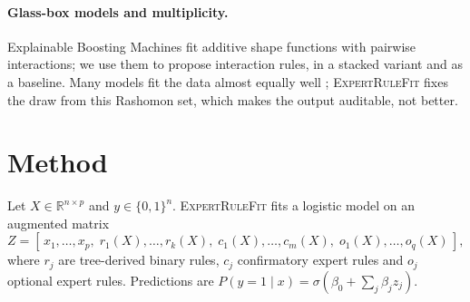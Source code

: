 \documentclass[11pt,a4paper]{article}
\theoremstyle{definition}\newtheorem{definition}{Definition}
\begin{document}
\paragraph{Glass-box models and multiplicity.} Explainable Boosting Machines \citep{lou2013,nori2019} fit additive shape functions with pairwise interactions; we use them to propose interaction rules, in a stacked variant and as a baseline. Many models fit the data almost equally well \citep{rudin2024}; \textsc{ExpertRuleFit} fixes the draw from this Rashomon set, which makes the output auditable, not better.

\begin{table}[h]
\centering\small
\caption{Positioning (summary of the cited works).}
\label{tab:position}
\end{table}

\section{Method}\label{sec:method}

Let $X\in\mathbb{R}^{n\times p}$ and $y\in\{0,1\}^n$. \textsc{ExpertRuleFit} fits a logistic model on an augmented matrix
\[
Z = [\,x_1,\dots,x_p,\; r_1(X),\dots,r_k(X),\; c_1(X),\dots,c_m(X),\; o_1(X),\dots,o_q(X)\,],
\]
where $r_j$ are tree-derived binary rules, $c_j$ confirmatory expert rules and $o_j$ optional expert rules. Predictions are $P(y=1\mid x)=\sigma(\beta_0+\sum_j \beta_j z_j)$.
\end{document}

